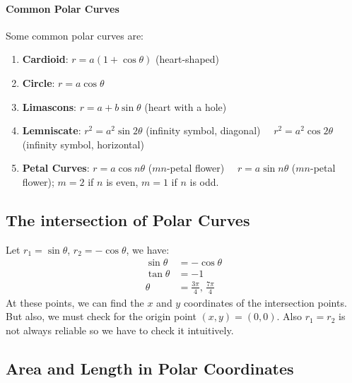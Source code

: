\documentclass[11pt]{article}
\begin{document}
\paragraph{Common Polar Curves} Some common polar curves are:
\begin{enumerate}
    \item \textbf{Cardioid}: $r = a(1 + \cos \theta)$ (heart-shaped)
    \item \textbf{Circle}: $r = a\cos \theta$ 
    \item \textbf{Limascons}: $r = a + b\sin \theta$ (heart with a hole)
    \item \textbf{Lemniscate}: $r^2 = a^2\sin 2\theta$ (infinity symbol, diagonal) \vspace{1em} $\quad r^2 = a^2\cos 2\theta$ (infinity symbol, horizontal)
    \item \textbf{Petal Curves}: $r = a\cos n\theta$ ($mn$-petal flower) \vspace{1em} $\quad r = a\sin n\theta$ ($mn$-petal flower); $m=2$ if $n$ is even, $m=1$ if $n$ is odd.
\end{enumerate}
\subsection{The intersection of Polar Curves}
\begin{example}
    Let $r_1 = \sin \theta$, $r_2 = -\cos \theta$, we have:
    \begin{align*}
        \sin \theta &= -\cos \theta \\
        \tan \theta &= -1 \\
        \theta &= \frac{3\pi}{4},\, \frac{7\pi}{4}
    \end{align*}
    At these points, we can find the $x$ and $y$ coordinates of the intersection points. But also, we must check for the origin point $(x,y) = (0,0)$. Also $r_1 = r_2$ is not always reliable so we have to check it intuitively.
\end{example}
\subsection{Area and Length in Polar Coordinates}
\end{document}
